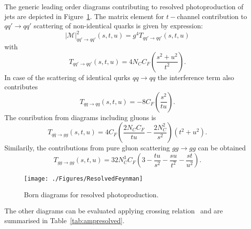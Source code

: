 The generic leading order diagrams contributing to resolved photoproduction of jets are depicted in Figure~\ref{fig:bornresolvedfeyn}. The matrix element for $t-$channel contribution to $qq'\rightarrow qq'$ scattering of non-identical quarks is given by expression:
\begin{equation}
 \left| \mathcal{M} \right|^2_{qq'\rightarrow qq'} \left( s,t,u \right) = g^4T_{qq'\rightarrow qq'}\left( s,t,u \right)
\end{equation}
with 
\begin{equation}
 T_{qq'\rightarrow qq'}\left( s,t,u \right) = 4N_C C_F\left( \frac{s^2+u^2}{t^2} \right).
\end{equation}
In case of the scattering of identical qurks $qq\rightarrow qq$ the interference term also contributes
\begin{equation}
  T_{qq\rightarrow qq}\left( s,t,u \right) = -8C_F\left( \frac{s^2}{tu} \right).
\end{equation}
The conribution from diagrams including gluons is
\begin{equation}
  T_{q\bar{q}\rightarrow gg}\left( s,t,u \right) = 4C_F\left( \frac{2N_C C_F}{tu} - \frac{2N_C^2}{s^2} \right)\left(t^2 + u^2\right). 
\end{equation}
Similarily, the contributions from pure gluon scattering $gg \rightarrow gg$ can be obtained 
\begin{equation}
 T_{gg\rightarrow gg}\left( s,t,u \right) = 32N_C^3C_F\left( 3 - \frac{tu}{s^2} - \frac{su}{t^2} -\frac{st}{u^2}\right). 
\end{equation}

\begin{figure}[h]
 \centering
 \texttt{[image: ./Figures/ResolvedFeynman]}
 \caption{Born diagrams for resolved photoproduction.}
 \label{fig:bornresolvedfeyn}
\end{figure}
The other diagrams can be evaluated applying crossing relation~\cite{Ell86} and are summarised in Table~\ref{tab:ampresolved}.

